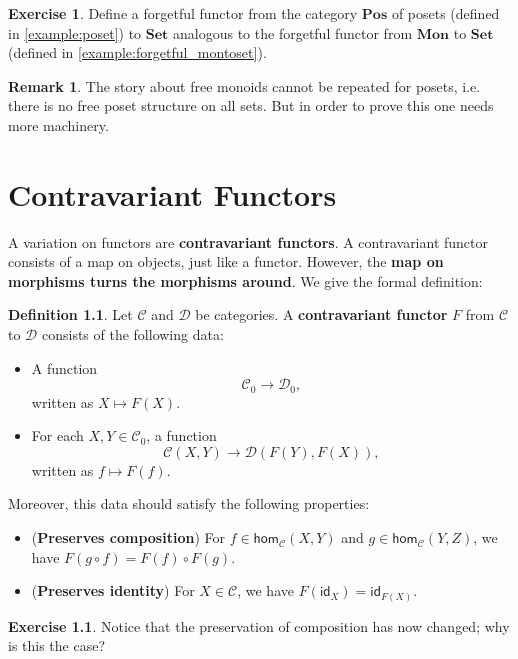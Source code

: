 \documentclass[a4paper,11pt, oneside,titlepage=false]{scrbook}
\theoremstyle{plain}
\theoremstyle{definition}
\newtheorem{rem}[thm]{Remark}
\newtheorem{dfn}[thm]{Definition}
\newtheorem{exer}[thm]{Exercise}
\newcommand{\cfont}[1]{\ensuremath{\mathsf{#1}}}
\newcommand{\Cat}[1]{\mathcal{#1}}
\newcommand{\CC}{\Cat{C}}
\newcommand{\DD}{\Cat{D}}
\newcommand{\Catb}[1]{\mathbf{#1}}
\newcommand{\SET}{\Catb{Set}}
\newcommand{\POS}{\Catb{Pos}}
\newcommand{\MON}{\Catb{Mon}}
\newcommand{\Ob}[1]{{#1}_0}
\newcommand{\Hom}[3][]{\cfont{hom}_{#1}(#2,#3)}
\newcommand{\CHom}[3]{{#1}(#2,#3)}
\newcommand{\Id}[1][]{\cfont{id}_{#1}}
\newcommand{\co}[2]{\ensuremath{#2 \circ #1}}
\begin{document}
\begin{exer} Define a forgetful functor from the category $\POS$ of posets (defined in \cref{example:poset}) to $\SET$ analogous to the forgetful functor from $\MON$ to $\SET$ (defined in \cref{example:forgetful_montoset}).
\end{exer}
\begin{rem} The story about free monoids cannot be repeated for posets, i.e. there is no free poset structure on all sets. But in order to prove this one needs more machinery.
\end{rem}



\chapter{Contravariant Functors}

A variation on functors are \textbf{contravariant functors}.
A contravariant functor consists of a map on objects, just like a functor.
However, the \textbf{map on morphisms turns the morphisms around}.
We give the formal definition:

\begin{dfn} Let $\CC$ and $\DD$ be categories. A \textbf{contravariant functor} $F$ from $\CC$ to $\DD$ consists of the following data:
\begin{itemize}
\item A function
\[
\Ob{\CC} \to \Ob{\DD},
\]
written as $X\mapsto F(X)$.
\item For each $X,Y\in \Ob{\CC}$, a function
\[
\CHom{\CC}{X}{Y} \to \CHom{\DD}{F(Y)}{F(X)},
\]
written as $f\mapsto F(f)$.
\end{itemize}
Moreover, this data should satisfy the following properties:
\begin{itemize}
\item (\textbf{Preserves composition}) For $f\in \Hom[\CC]{X}{Y}$ and $g\in \Hom[\CC]{Y}{Z}$, we have $F(\co f g) =  \co {F(g)}{F(f)}$.
\item (\textbf{Preserves identity}) For $X\in\CC$, we have $F(\Id[X]) = \Id[F(X)]$.
\end{itemize}
\end{dfn}

\begin{exer} Notice that the preservation of composition has now changed; why is this the case?
\end{exer}
\end{document}
